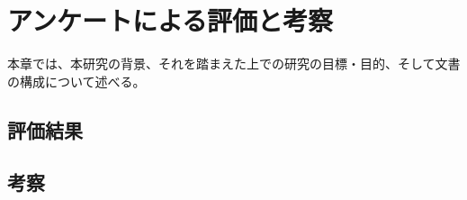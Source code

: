 \chapter{アンケートによる評価と考察}
\label{chap:result}

本章では、本研究の背景、それを踏まえた上での研究の目標・目的、そして文書の構成について述べる。

\section{評価結果}


\section{考察}


